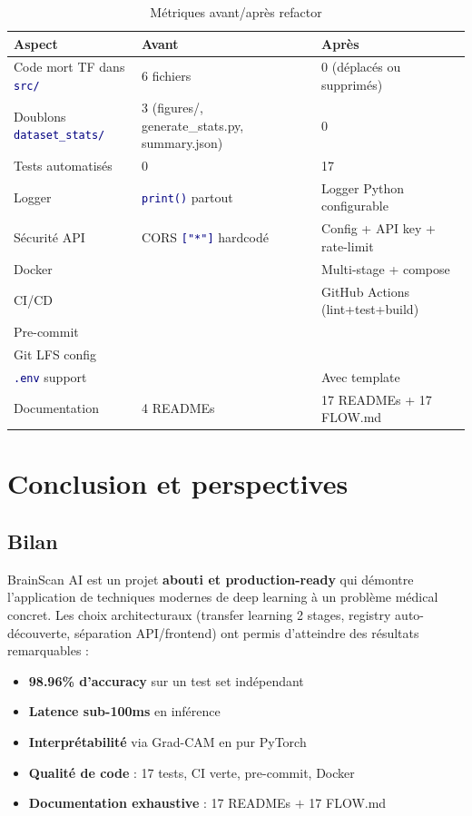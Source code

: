 \documentclass[11pt,a4paper,oneside]{report}
\newcommand{\cmark}{\ding{51}}
\newcommand{\xmark}{\ding{55}}
\newcommand{\code}[1]{\texttt{\textcolor{navy}{#1}}}
\newcommand{\rt}[1]{\textcolor{accentred}{#1}}
\newcommand{\gn}[1]{\textcolor{accentgreen}{#1}}
\begin{document}
\begin{table}[!htbp]
\centering
\caption{Métriques avant/après refactor}
\begin{tabularx}{\textwidth}{|l|X|X|}
\hline
\textbf{Aspect} & \textbf{Avant} & \textbf{Après} \\
\hline
Code mort TF dans \code{src/} & 6 fichiers & 0 (déplacés ou supprimés) \\
\hline
Doublons \code{dataset\_stats/} & 3 (figures/, generate\_stats.py, summary.json) & 0 \\
\hline
Tests automatisés & 0 & 17 \\
\hline
Logger & \code{print()} partout & Logger Python configurable \\
\hline
Sécurité API & CORS \code{["*"]} hardcodé & Config + API key + rate-limit \\
\hline
Docker & \rt{\xmark} & \gn{Multi-stage + compose} \\
\hline
CI/CD & \rt{\xmark} & GitHub Actions (lint+test+build) \\
\hline
Pre-commit & \rt{\xmark} & \gn{\cmark} \\
\hline
Git LFS config & \rt{\xmark} & \gn{\cmark} \\
\hline
\code{.env} support & \rt{\xmark} & \gn{Avec template} \\
\hline
Documentation & 4 READMEs & 17 READMEs + 17 FLOW.md \\
\hline
\end{tabularx}
\end{table}

\chapter{Conclusion et perspectives}

\section{Bilan}

BrainScan AI est un projet \textbf{abouti et production-ready} qui démontre l'application de techniques modernes de deep learning à un problème médical concret. Les choix architecturaux (transfer learning 2 stages, registry auto-découverte, séparation API/frontend) ont permis d'atteindre des résultats remarquables :

\begin{itemize}
\item \textbf{98.96\% d'accuracy} sur un test set indépendant
\item \textbf{Latence sub-100ms} en inférence
\item \textbf{Interprétabilité} via Grad-CAM en pur PyTorch
\item \textbf{Qualité de code} : 17 tests, CI verte, pre-commit, Docker
\item \textbf{Documentation exhaustive} : 17 READMEs $+$ 17 FLOW.md
\end{itemize}
\end{document}
